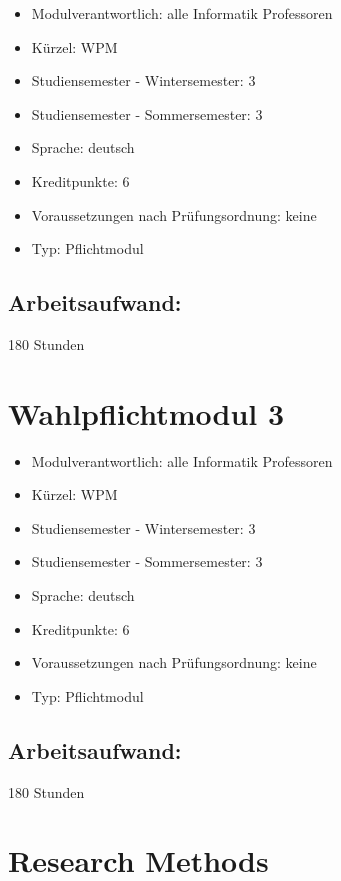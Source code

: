 \begin{itemize}
\tightlist
\item
  Modulverantwortlich: alle Informatik Professoren
\item
  Kürzel: WPM
\item
  Studiensemester - Wintersemester: 3
\item
  Studiensemester - Sommersemester: 3
\item
  Sprache: deutsch
\item
  Kreditpunkte: 6
\item
  Voraussetzungen nach Prüfungsordnung: keine
\item
  Typ: Pflichtmodul
\end{itemize}

\section*{Arbeitsaufwand:}\label{arbeitsaufwand-7}

180 Stunden

\chapter{Wahlpflichtmodul 3}\label{wahlpflichtmodul-3}

\begin{itemize}
\tightlist
\item
  Modulverantwortlich: alle Informatik Professoren
\item
  Kürzel: WPM
\item
  Studiensemester - Wintersemester: 3
\item
  Studiensemester - Sommersemester: 3
\item
  Sprache: deutsch
\item
  Kreditpunkte: 6
\item
  Voraussetzungen nach Prüfungsordnung: keine
\item
  Typ: Pflichtmodul
\end{itemize}

\section*{Arbeitsaufwand:}\label{arbeitsaufwand-8}

180 Stunden

\chapter{Research Methods}\label{research-methods}

